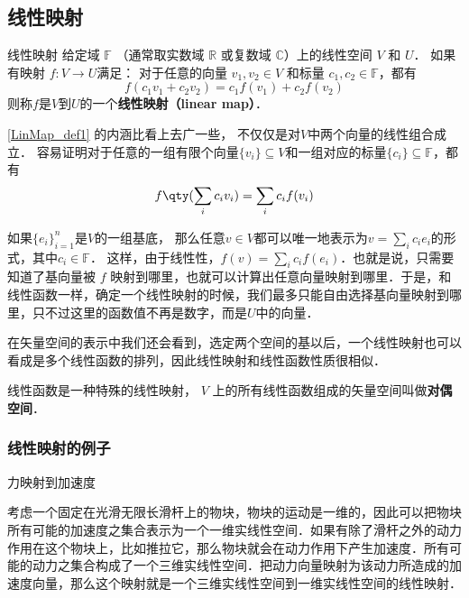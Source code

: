 


\subsection{线性映射}
\begin{definition}{线性映射}\label{LinMap_def1}
给定域 $\mathbb F$ （通常取实数域 $\mathbb R$ 或复数域 $\mathbb C$）上的线性空间 $V$ 和 $U$． 如果有映射 $f:V\rightarrow U$满足： 对于任意的向量 ${v}_1, {v}_2\in V$ 和标量 $c_1, c_2 \in \mathbb{F}$，都有
\begin{equation}
f(c_1 {v}_1+c_2 {v}_2)=c_1f({v}_1)+c_2f({v}_2)
\end{equation}
则称$f$是$V$到$U$的一个\textbf{线性映射（linear map）}．
\end{definition}

\autoref{LinMap_def1} 的内涵比看上去广一些， 不仅仅是对$V$中两个向量的线性组合成立． 容易证明对于任意的一组有限个向量$\{{v}_i\}\subseteq V$和一组对应的标量$\{c_i\}\subseteq\mathbb{F}$，都有
\begin{equation}\label{LinMap_eq1}
f\qty(\sum_i c_i {v}_i)=\sum_i c_i f({v}_i)
\end{equation}

如果$\{{e}_i\}_{i=1}^n$是$V$的一组基底， 那么任意${v}\in V$都可以唯一地表示为${v}=\sum_i c_i {e}_i$的形式，其中$c_i\in\mathbb{F}$． 这样，由于线性性，$f({v})=\sum_ic_if({e}_i)$．也就是说，只需要知道了基向量被 $f$ 映射到哪里，也就可以计算出任意向量映射到哪里．于是，和线性函数一样，确定一个线性映射的时候，我们最多只能自由选择基向量映射到哪里，只不过这里的函数值不再是数字，而是$U$中的向量．

在矢量空间的表示中我们还会看到，选定两个空间的基以后，一个线性映射也可以看成是多个线性函数的排列，因此线性映射和线性函数性质很相似．

线性函数是一种特殊的线性映射， $V$ 上的所有线性函数组成的矢量空间叫做\textbf{对偶空间}．

\subsubsection{线性映射的例子}

\begin{example}{力映射到加速度}

考虑一个固定在光滑无限长滑杆上的物块，物块的运动是一维的，因此可以把物块所有可能的加速度之集合表示为一个一维实线性空间．如果有除了滑杆之外的动力作用在这个物块上，比如推拉它，那么物块就会在动力作用下产生加速度．所有可能的动力之集合构成了一个三维实线性空间．把动力向量映射为该动力所造成的加速度向量，那么这个映射就是一个三维实线性空间到一维实线性空间的线性映射．

\end{example}


